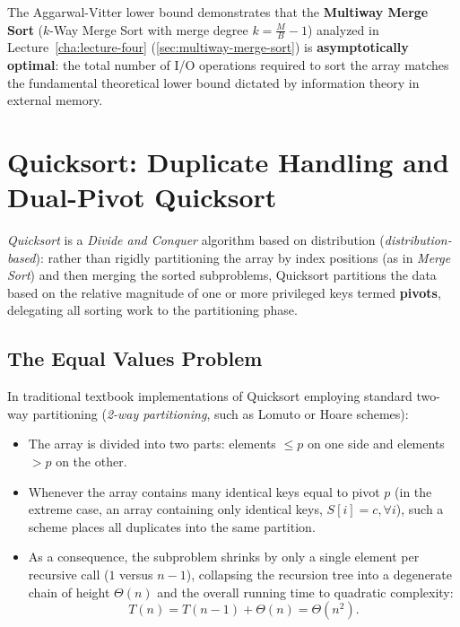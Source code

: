\begin{property}
The Aggarwal-Vitter lower bound demonstrates that the \textbf{Multiway Merge Sort} ($k$-Way Merge Sort with merge degree $k = \frac{M}{B} - 1$) analyzed in Lecture~\ref{cha:lecture-four} (\autoref{sec:multiway-merge-sort}) is \textbf{asymptotically optimal}: the total number of I/O operations required to sort the array matches the fundamental theoretical lower bound dictated by information theory in external memory.
\end{property}

\FloatBarrier
\section{Quicksort: Duplicate Handling and Dual-Pivot Quicksort}
\label{sec:quicksort-and-dual-pivot}

\textit{Quicksort} is a \textit{Divide and Conquer} algorithm based on distribution (\textit{distribution-based}): rather than rigidly partitioning the array by index positions (as in \textit{Merge Sort}) and then merging the sorted subproblems, Quicksort partitions the data based on the relative magnitude of one or more privileged keys termed \textbf{pivots}, delegating all sorting work to the partitioning phase.

\subsection{The Equal Values Problem}
\label{subsec:equal-values-problem}

In traditional textbook implementations of Quicksort employing standard two-way partitioning (\textit{2-way partitioning}, such as Lomuto or Hoare schemes):
\begin{itemize}
  \item The array is divided into two parts: elements $\le p$ on one side and elements $> p$ on the other.
  \item Whenever the array contains many identical keys equal to pivot $p$ (in the extreme case, an array containing only identical keys, $S[i] = c, \forall i$), such a scheme places all duplicates into the same partition.
  \item As a consequence, the subproblem shrinks by only a single element per recursive call ($1$ versus $n-1$), collapsing the recursion tree into a degenerate chain of height $\Theta(n)$ and the overall running time to quadratic complexity:
  \begin{equation}
    T(n) = T(n - 1) + \Theta(n) = \Theta(n^2).
  \end{equation}
\end{itemize}

